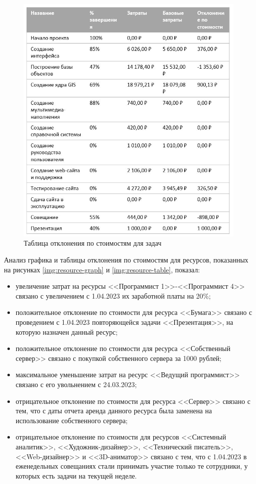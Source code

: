 \begin{figure}[H]
	\begin{center}
		\includegraphics[scale=0.4]{inc/img/task-table.jpg}
	\end{center}
	\captionsetup{justification=centering}
	\caption{Таблица отклонения по стоимостям для задач}
	\label{img:task-table}
\end{figure}

Анализ графика и таблицы отклонения по стоимостям для ресурсов, показанных на рисунках \ref{img:resource-graph} и \ref{img:resource-table}, показал:

\begin{itemize}
	\item увеличение затрат на ресурсы <<Программист 1>>-<<Программист 4>> связано с увеличением с 1.04.2023 их заработной платы на 20\%;
	\item положительное отклонение по стоимости для ресурса <<Бумага>> связано с проведением с 1.04.2023 повторяющейся задачи <<Презентация>>, на которую назначен данный ресурс;
	\item положительное отклонение по стоимости для ресурса <<Собственный сервер>> связано с покупкой собственного сервера за 1000 рублей;
	\item максимальное уменьшение затрат на ресурс <<Ведущий программист>> связано с его увольнением с 24.03.2023;
	\item отрицательное отклонение по стоимости для ресурса <<Сервер>> связано с тем, что с даты отчета аренда данного ресурса была заменена на использование собственного сервера;
	\item отрицательное отклонение по стоимости для ресурсов <<Системный аналитик>>, <<Художник-дизайнер>>, <<Технический писатель>>, <<Web-дизайнер>> и <<3D-аниматор>> связано с тем, что с 1.04.2023 в еженедельных совещаниях стали принимать участие только те сотрудники, у которых есть задачи на текущей неделе.
\end{itemize}

